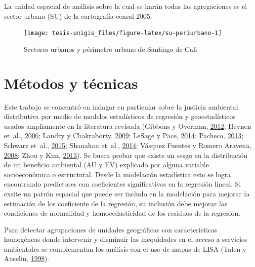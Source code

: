 \documentclass[12pt,a4paper,openany]{book}
\theoremstyle{definition}
\theoremstyle{definition}
\theoremstyle{definition}
\theoremstyle{remark}
\begin{document}
La unidad espacial de análisis sobre la cual se harán todas las
agregaciones es el sector urbano (SU) de la cartografía censal 2005.

\begin{figure}[H]

{\centering \texttt{[image: tesis-unigis\_files/figure-latex/su-periurbano-1]} 

}

\caption{Sectores urbanos y périmetro urbano de Santiago de Cali}\label{fig:su-periurbano}
\end{figure}

\section{Métodos y técnicas}\label{muxe9todos-y-tuxe9cnicas}

Este trabajo se concentró en indagar en particular sobre la justicia
ambiental distributiva por medio de modelos estadísticos de regresión y
geoestadísticos usados ampliamente en la literatura revisada (Gibbons y
Overman, \protect\hyperlink{ref-gibbons_mostly_2012}{2012}; Heynen
et~al., \protect\hyperlink{ref-heynen_political_2006}{2006}; Landry y
Chakraborty, \protect\hyperlink{ref-landry_street_2009}{2009}; LeSage y
Pace, \protect\hyperlink{ref-lesage_biggest_2014}{2014}; Pacheco,
\protect\hyperlink{ref-PACHECO2013121}{2013}; Schwarz et~al.,
\protect\hyperlink{ref-schwarz_trees_2015}{2015}; Shanahan et~al.,
\protect\hyperlink{ref-shanahan_socio-economic_2014}{2014}; Vásquez
Fuentes y Romero Aravena,
\protect\hyperlink{ref-vasquez_fuentes_vegetacion_2008}{2008}; Zhou y
Kim, \protect\hyperlink{ref-zhou_social_2013}{2013}). Se busca probar
que existe un sesgo en la distribución de un beneficio ambiental (AU y
EV) explicado por alguna variable socioeconómica o estructural. Desde la
modelación estadística esto se logra encontrando predictores con
coeficientes significativos en la regresión lineal. Si exsite un patrón
espacial que puede ser includo en la modelación para mejorar la
estimación de los coeficiente de la regresión, su inclusión debe mejorar
las condiciones de normalidad y homocedasticidad de los residuos de la
regresión.

Para detectar agrupaciones de unidades geográficas con características
homogéneas donde intervenir y disminuir las inequidades en el acceso a
servicios ambientales se complementan los análisis con el uso de mapas
de LISA (Talen y Anselin,
\protect\hyperlink{ref-talen_assessing_1998}{1998}).
\end{document}
